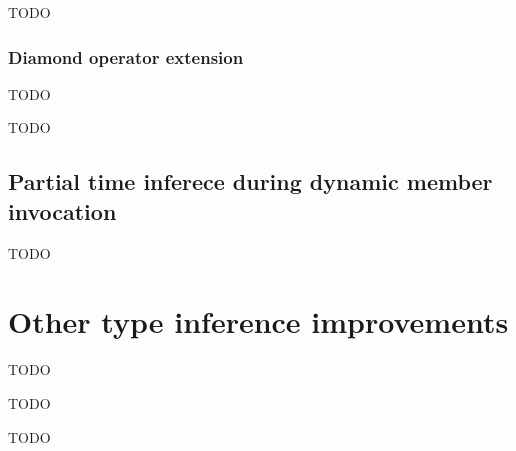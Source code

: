 TODO

\subsubsection*{Diamond operator extension}

TODO


TODO

\subsection{Partial time inferece during dynamic member invocation}

TODO

\section{Other type inference improvements}

TODO


TODO


TODO